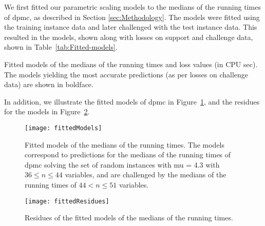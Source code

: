 We first fitted our parametric scaling models to the
medians of the
 running times
of dpmc, as described in Section \ref{sec:Methodology}. The
models were fitted using the training instance data and later
challenged with the test instance data.
This resulted in the models, shown along with losses on support and
challenge data, shown in Table~\ref{tab:Fitted-models}.
\begin{table}[tb]
\begin{centering}

% 
\par\end{centering}

\caption{\label{tab:Fitted-models}Fitted models of the medians
of the  running
times and loss
values (in CPU sec). The models yielding the most
accurate predictions (as per losses on challenge data) are shown in
boldface.}
\end{table}
In addition, we illustrate the fitted models of dpmc in
Figure~\ref{fig:Fitted-models},
and the residues for the models in Figure~\ref{fig:Fitted-residues}.
\begin{figure}[tb]
\noindent \begin{centering}
\texttt{[image: fittedModels]}
\par\end{centering}

\caption{\label{fig:Fitted-models} Fitted models of the medians of the
 running times.
The models correspond to predictions for the medians of the
 running times of
dpmc solving the set of random instances with mu = 4.3
with $36\leq n\leq 44$ variables, and are challenged by the medians of
the 
running times of $44< n \leq 51$ variables.}
\end{figure}


\begin{figure}[tb]
\noindent \begin{centering}
\texttt{[image: fittedResidues]}
\par\end{centering}

\caption{\label{fig:Fitted-residues} Residues of the fitted models of the
medians of the 
running times. }
\end{figure}


